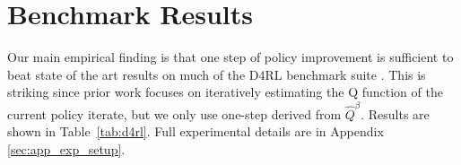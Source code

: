 




\section{Benchmark Results}\label{sec:bench}

Our main empirical finding is that one step of policy improvement is sufficient to beat state of the art results on much of the D4RL benchmark suite \cite{fu2020d4rl}.
This is striking since prior work focuses on iteratively estimating the Q function of the current policy iterate, but we only use one-step derived from $ \widehat Q^\beta$. Results are shown in Table~\ref{tab:d4rl}. Full experimental details are in Appendix \ref{sec:app_exp_setup}.

